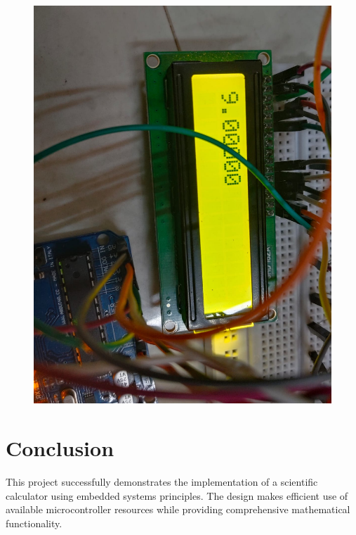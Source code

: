 \documentclass[journal]{IEEEtran}
\begin{document}
\begin{figure}[H]
\begin{minipage}{0.45\linewidth}
        \includegraphics[width=1.0\linewidth]{fig/dmas0.jpeg}
        \label{fig:enter-label}
        \end{minipage}
\end{figure}

\section{Conclusion}
This project successfully demonstrates the implementation of a scientific calculator using embedded systems principles. The design makes efficient use of available microcontroller resources while providing comprehensive mathematical functionality. 
\end{document}
